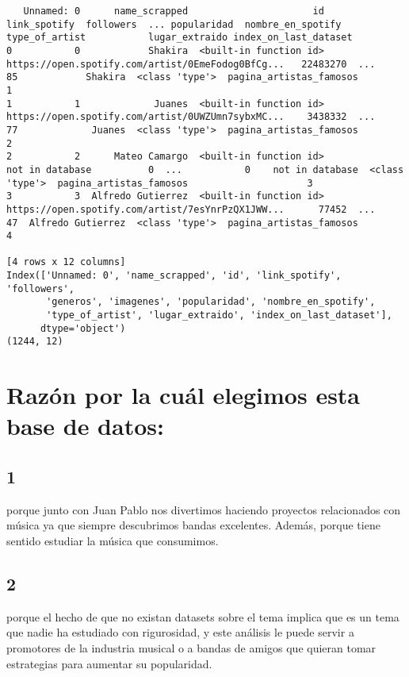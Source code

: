 \documentclass[11pt]{article}
\begin{document}
\begin{verbatim}
   Unnamed: 0      name_scrapped                      id                                       link_spotify  followers  ... popularidad  nombre_en_spotify  type_of_artist           lugar_extraido index_on_last_dataset
0           0            Shakira  <built-in function id>  https://open.spotify.com/artist/0EmeFodog0BfCg...   22483270  ...          85            Shakira  <class 'type'>  pagina_artistas_famosos                     1
1           1             Juanes  <built-in function id>  https://open.spotify.com/artist/0UWZUmn7sybxMC...    3438332  ...          77             Juanes  <class 'type'>  pagina_artistas_famosos                     2
2           2      Mateo Camargo  <built-in function id>                                    not in database          0  ...           0    not in database  <class 'type'>  pagina_artistas_famosos                     3
3           3  Alfredo Gutierrez  <built-in function id>  https://open.spotify.com/artist/7esYnrPzQX1JWW...      77452  ...          47  Alfredo Gutierrez  <class 'type'>  pagina_artistas_famosos                     4

[4 rows x 12 columns]
Index(['Unnamed: 0', 'name_scrapped', 'id', 'link_spotify', 'followers',
       'generos', 'imagenes', 'popularidad', 'nombre_en_spotify',
       'type_of_artist', 'lugar_extraido', 'index_on_last_dataset'],
      dtype='object')
(1244, 12)
\end{verbatim}

\section{Razón por la cuál elegimos esta base de datos:}
\label{sec:org221346a}
\subsection{1}
\label{sec:org1ce1ac4}
porque junto con Juan Pablo nos divertimos haciendo proyectos relacionados con música ya que siempre descubrimos bandas excelentes. Además, porque tiene sentido estudiar la música que consumimos.
\subsection{2}
\label{sec:org51d3326}
porque el hecho de que no existan datasets sobre el tema implica que es un tema que nadie ha estudiado con rigurosidad, y este análisis le puede servir a promotores de la industria musical o a bandas de amigos que quieran tomar estrategias para aumentar su popularidad.
\end{document}

